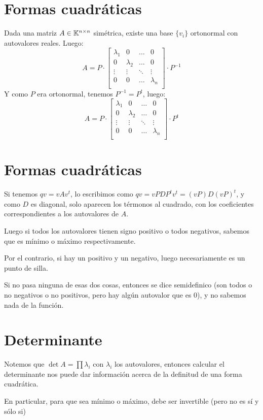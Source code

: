 \documentclass{article}
\begin{document}
\section*{Formas cuadráticas}
Dada una matriz $A \in \mathbb{K}^{n \times n}$ simétrica, existe una base $\{v_i\}$ ortonormal con autovalores reales. Luego:
\[
	A = P \cdot
	\begin{bmatrix}
		\lambda_1 & 0 & \dots & 0 \\
		0 & \lambda_2 & \dots & 0 \\
		\vdots & \vdots & \ddots & \vdots \\
		0 & 0 & \dots & \lambda_n \\
	\end{bmatrix} \cdot
	P^{-1}
\]
Y como $P$ era ortonormal, tenemos $P^{-1} = P^t$, luego:
\[
	A = P \cdot
	\begin{bmatrix}
		\lambda_1 & 0 & \dots & 0 \\
		0 & \lambda_2 & \dots & 0 \\
		\vdots & \vdots & \ddots & \vdots \\
		0 & 0 & \dots & \lambda_n \\
	\end{bmatrix} \cdot
	P^t
\]
\section*{Formas cuadráticas}
Si tenemos $qv = vAv^t$, lo escribimos como $qv = vPDP^tv^t = (vP)D(vP)^t$, y como $D$ es diagonal, solo aparecen los térmonos al cuadrado, con los coeficientes correspondientes a los autovalores de $A$.

Luego si todos los autovalores tienen signo positivo o todos negativos, sabemos que es mínimo o máximo respectivamente.

Por el contrario, si hay un positivo y un negativo, luego necesariamente es un punto de silla.

Si no pasa ninguna de esas dos cosas, entonces se dice semidefinico (son todos o no negativos o no positivos, pero hay algún autovalor que es $0$), y no sabemos nada de la función.

\section*{Determinante}
Notemos que $\det A = \prod \lambda_i$ con $\lambda_i$ los autovalores, entonces calcular el determinante nos puede dar información acerca de la definitud de una forma cuadrática.

En particular, para que sea mínimo o máximo, debe ser invertible (pero no es sí y sólo si)
\end{document}

